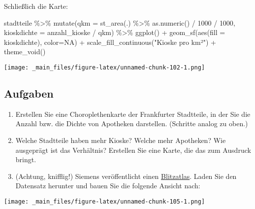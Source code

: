 \documentclass[11pt,german,a4paper]{article}
\newenvironment{Shaded}{\begin{snugshade}}{\end{snugshade}}
\newcommand{\AttributeTok}[1]{\textcolor[rgb]{0.77,0.63,0.00}{#1}}
\newcommand{\ConstantTok}[1]{\textcolor[rgb]{0.00,0.00,0.00}{#1}}
\newcommand{\DecValTok}[1]{\textcolor[rgb]{0.00,0.00,0.81}{#1}}
\newcommand{\FunctionTok}[1]{\textcolor[rgb]{0.00,0.00,0.00}{#1}}
\newcommand{\NormalTok}[1]{#1}
\newcommand{\SpecialCharTok}[1]{\textcolor[rgb]{0.00,0.00,0.00}{#1}}
\newcommand{\StringTok}[1]{\textcolor[rgb]{0.31,0.60,0.02}{#1}}
\begin{document}
Schließlich die Karte:

\begin{Shaded}
\begin{Highlighting}[]
\NormalTok{stadtteile }\SpecialCharTok{\%\textgreater{}\%}
  \FunctionTok{mutate}\NormalTok{(}\AttributeTok{qkm =} \FunctionTok{st\_area}\NormalTok{(.) }\SpecialCharTok{\%\textgreater{}\%} \FunctionTok{as.numeric}\NormalTok{() }\SpecialCharTok{/} \DecValTok{1000} \SpecialCharTok{/} \DecValTok{1000}\NormalTok{,}
         \AttributeTok{kioskdichte =}\NormalTok{ anzahl\_kioske }\SpecialCharTok{/}\NormalTok{ qkm) }\SpecialCharTok{\%\textgreater{}\%}
  \FunctionTok{ggplot}\NormalTok{() }\SpecialCharTok{+}
    \FunctionTok{geom\_sf}\NormalTok{(}\FunctionTok{aes}\NormalTok{(}\AttributeTok{fill =}\NormalTok{ kioskdichte), }\AttributeTok{color=}\ConstantTok{NA}\NormalTok{) }\SpecialCharTok{+}
    \FunctionTok{scale\_fill\_continuous}\NormalTok{(}\StringTok{"Kioske pro km²"}\NormalTok{) }\SpecialCharTok{+}
    \FunctionTok{theme\_void}\NormalTok{()}
\end{Highlighting}
\end{Shaded}

\texttt{[image: \_main\_files/figure-latex/unnamed-chunk-102-1.png]}

\hypertarget{aufgaben-4}{%
\subsection{Aufgaben}\label{aufgaben-4}}

\begin{enumerate}
\def\labelenumi{\arabic{enumi}.}
\item
  Erstellen Sie eine Choroplethenkarte der Frankfurter Stadtteile, in der Sie die Anzahl bzw. die Dichte von Apotheken darstellen. (Schritte analog zu oben.)
\item
  Welche Stadtteile haben mehr Kioske? Welche mehr Apotheken? Wie ausgeprägt ist das Verhältnis? Erstellen Sie eine Karte, die das zum Ausdruck bringt.
\item
  (Achtung, knifflig!) Siemens veröffentlicht einen \href{https://press.siemens.com/global/de/feature/wo-blitzt-es-am-haeufigsten}{Blitzatlas}. Laden Sie den Datensatz herunter und bauen Sie die folgende Ansicht nach:
\end{enumerate}

\texttt{[image: \_main\_files/figure-latex/unnamed-chunk-105-1.png]}
\end{document}
